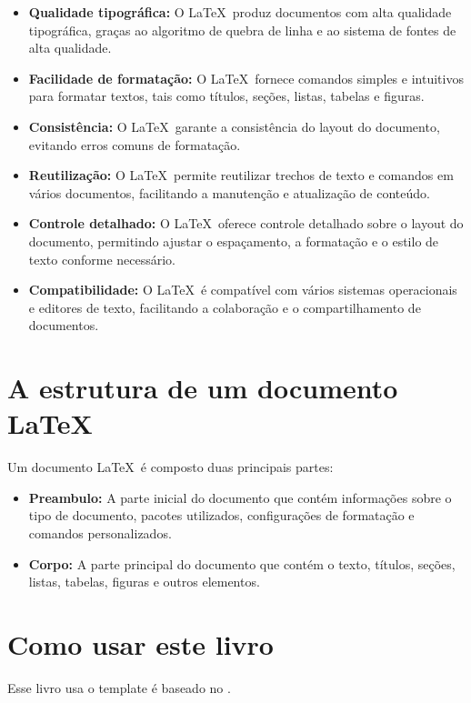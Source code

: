 \begin{itemize}
	\item \textbf{Qualidade tipográfica:} O \LaTeX\ produz documentos com alta qualidade tipográfica, graças ao algoritmo de quebra de linha e ao sistema de fontes de alta qualidade.
	\item \textbf{Facilidade de formatação:} O \LaTeX\ fornece comandos simples e intuitivos para formatar textos, tais como títulos, seções, listas, tabelas e figuras.
	\item \textbf{Consistência:} O \LaTeX\ garante a consistência do layout do documento, evitando erros comuns de formatação.
	\item \textbf{Reutilização:} O \LaTeX\ permite reutilizar trechos de texto e comandos em vários documentos, facilitando a manutenção e atualização de conteúdo.
	\item \textbf{Controle detalhado:} O \LaTeX\ oferece controle detalhado sobre o layout do documento, permitindo ajustar o espaçamento, a formatação e o estilo de texto conforme necessário.
	\item \textbf{Compatibilidade:} O \LaTeX\ é compatível com vários sistemas operacionais e editores de texto, facilitando a colaboração e o compartilhamento de documentos.

\end{itemize}

\section{A estrutura de um documento \LaTeX}

Um documento \LaTeX\ é composto duas principais partes:

\begin{itemize}
	\item \textbf{Preambulo:} A parte inicial do documento que contém informações sobre o tipo de documento, pacotes utilizados, configurações de formatação e comandos personalizados.
	\item \textbf{Corpo:} A parte principal do documento que contém o texto, títulos, seções, listas, tabelas, figuras e outros elementos.
\end{itemize}


\section{Como usar este livro}

Esse livro usa o template \'e baseado no \cite{carauma}.



